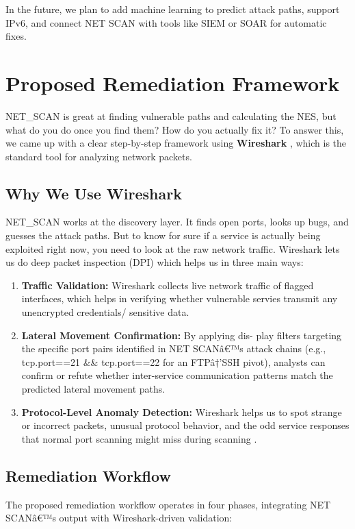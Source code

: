 \documentclass[conference]{IEEEtran}
\begin{document}
In the future, we plan to add machine learning to predict attack paths, support IPv6, and connect NET SCAN with tools like SIEM or SOAR for automatic fixes.

\section{Proposed Remediation Framework}
NET\_SCAN is great at finding vulnerable paths and calculating the NES, but what do you do once you find them? How do you actually fix it? To answer this, we came up with a clear step-by-step framework using \textbf{Wireshark} \cite{wireshark_ref}, which is the standard tool for analyzing network packets.

\subsection{Why We Use Wireshark}
NET\_SCAN works at the discovery layer. It finds open ports, looks up bugs, and guesses the attack paths. But to know for sure if a service is actually being exploited right now, you need to look at the raw network traffic. Wireshark lets us do deep packet inspection (DPI) which helps us in three main ways:
\begin{enumerate}
    \item \textbf{Traffic Validation:} Wireshark collects live network traffic of flagged interfaces, which helps in verifying whether vulnerable servies transmit any unencrypted credentials/ sensitive data. 
    \item \textbf{Lateral Movement Confirmation:} By applying dis-
play filters targeting the specific port pairs identified in
NET SCANâ€™s attack chains (e.g., tcp.port==21 &&
tcp.port==22 for an FTPâ†’SSH pivot), analysts can
confirm or refute whether inter-service communication
patterns match the predicted lateral movement paths.
    \item \textbf{Protocol-Level Anomaly Detection:} Wireshark helps us to spot strange or incorrect packets, unusual protocol behavior, and the odd service responses that normal port scanning might miss during scanning \cite{sanders2017}.
\end{enumerate}

\subsection{Remediation Workflow}
The proposed remediation workflow operates in four phases,
integrating NET SCANâ€™s output with Wireshark-driven validation:
\end{document}
